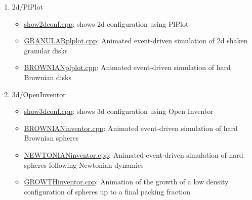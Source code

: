 \begin{itemize}
\begin{enumerate}
\item 2d/PlPlot\begin{itemize}
\item \hyperlink{show2dconf_8cpp}{show2dconf.cpp}: shows 2d configuration using PlPlot\item \hyperlink{GRANULARplplot_8cpp}{GRANULARplplot.cpp}: Animated event-driven simulation of 2d shaken granular disks\item \hyperlink{BROWNIANplplot_8cpp}{BROWNIANplplot.cpp}: Animated event-driven simulation of hard Brownian disks\end{itemize}
\item 3d/OpenInventor\begin{itemize}
\item \hyperlink{show3dconf_8cpp}{show3dconf.cpp}: shows 3d configuration using Open Inventor\item \hyperlink{BROWNIANinventor_8cpp}{BROWNIANinventor.cpp}: Animated event-driven simulation of hard Brownian spheres\item \hyperlink{NEWTONIANinventor_8cpp}{NEWTONIANinventor.cpp}: Animated event-driven simulation of hard spheres following Newtonian dynamics\item \hyperlink{GROWTHinventor_8cpp}{GROWTHinventor.cpp}: Animation of the growth of a low density configuration of spheres up to a final packing fraction\end{itemize}
\end{enumerate}
\end{itemize}
